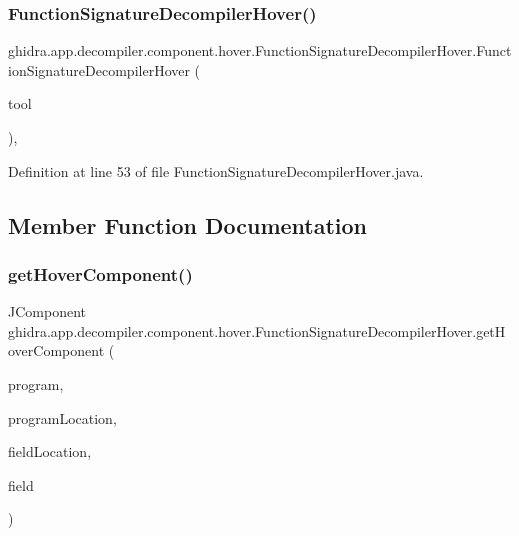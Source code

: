 \subsubsection{\texorpdfstring{FunctionSignatureDecompilerHover()}{FunctionSignatureDecompilerHover()}}
{\footnotesize\ttfamily ghidra.\+app.\+decompiler.\+component.\+hover.\+Function\+Signature\+Decompiler\+Hover.\+Function\+Signature\+Decompiler\+Hover (\begin{DoxyParamCaption}\item[{Plugin\+Tool}]{tool }\end{DoxyParamCaption})\hspace{0.3cm}{\ttfamily [inline]}, {\ttfamily [protected]}}



Definition at line 53 of file Function\+Signature\+Decompiler\+Hover.\+java.



\subsection{Member Function Documentation}
\mbox{\label{classghidra_1_1app_1_1decompiler_1_1component_1_1hover_1_1_function_signature_decompiler_hover_ad02afaa8a3143ab0e63231a32ef9629e}} 
\subsubsection{\texorpdfstring{getHoverComponent()}{getHoverComponent()}}
{\footnotesize\ttfamily J\+Component ghidra.\+app.\+decompiler.\+component.\+hover.\+Function\+Signature\+Decompiler\+Hover.\+get\+Hover\+Component (\begin{DoxyParamCaption}\item[{Program}]{program,  }\item[{Program\+Location}]{program\+Location,  }\item[{Field\+Location}]{field\+Location,  }\item[{Field}]{field }\end{DoxyParamCaption})\hspace{0.3cm}{\ttfamily [inline]}}



